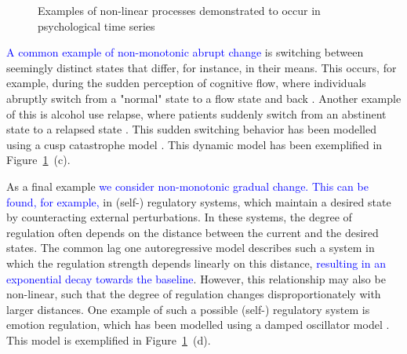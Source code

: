 \documentclass[man, floatsintext]{apa7}
\begin{document}
\begin{figure}[!t]
  \caption{Examples of non-linear processes demonstrated to occur in
    psychological time series}
  \label{fig:examplar_npn}
\end{figure}

\textcolor{blue}{A common example of non-monotonic abrupt change}
is switching between seemingly distinct
states that differ, for instance, in their means. This occurs, for example,
during the sudden perception of cognitive flow, where individuals abruptly
switch from a "normal" state to a flow state and back
\parencite{ceja_suddenly_2012}. Another example of this is alcohol use relapse,
where patients suddenly switch from an abstinent state to a relapsed state
\parencite{witkiewitz_modeling_2007}. This sudden switching behavior has been
modelled using a cusp catastrophe model
\parencite{van_der_maas_sudden_2003,chow_cusp_2015}. This dynamic model has
been exemplified in Figure~\ref{fig:examplar_npn}~(c).

As a final example \textcolor{blue}{we consider non-monotonic gradual change.
  This can be found, for example,} in (self-) regulatory systems, which
maintain a desired state by counteracting external perturbations. In these
systems, the degree of regulation often depends on the distance between the
current and the desired states. The common lag one autoregressive model
describes such a system in which the regulation strength depends linearly on
this distance, \textcolor{blue}{resulting in an exponential decay towards the
  baseline}. However, this relationship may also be non-linear, such that the
degree of regulation changes disproportionately with larger distances. One
example of such a possible (self-) regulatory system is emotion regulation,
which has been modelled using a damped oscillator model
\parencite{chow_emotion_2005}. This model is exemplified in
Figure~\ref{fig:examplar_npn}~(d).
\end{document}
